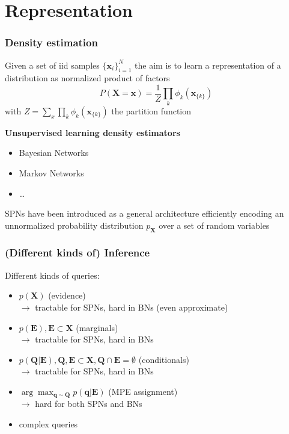 \documentclass[10pt, t, xcolor={usenames,dvipsnames,svgnames}, compress]{beamer}
\begin{document}
\section{Representation}
{
  \begin{frame}[c]
    \sectionpage
  \end{frame}
}

\begin{frame}
  \frametitle{Density estimation}

Given a set of iid samples $\{\mathbf x_i\}_{i=1}^N$ the aim is to learn a
representation of a distribution as normalized product of factors
$$P(\mathbf X = \mathbf x) = \frac{1}{Z}\prod_k \phi_k(\mathbf x_{\{k\}})$$
with $Z = \sum_x\prod_k \phi_k(\mathbf x_{\{k\}})$ the partition function

\vskip 0.5cm

{\color{violet} \textbf{Unsupervised learning density estimators}}
\begin{itemize}
  \item Bayesian Networks
  \item Markov Networks
  \item \ldots
\end{itemize}

SPNs have been introduced as a general architecture efficiently encoding an
unnormalized probability distribution $p_{\mathbf X}$ over a set of random 
variables


\end{frame}

\begin{frame}
  \frametitle{(Different kinds of) Inference}
  Different kinds of queries:
  \begin{itemize}
  \item $p(\mathbf{X})$ (evidence)\\
    \hfill {\color{violet} $\rightarrow$ tractable for SPNs, hard in BNs (even approximate)}
  \item $p(\mathbf{E}), \mathbf{E}\subset\mathbf{X}$ (marginals)\\
    \hfill {\color{violet} $\rightarrow$ tractable for SPNs, hard in BNs}
  \item $p(\mathbf{Q}|\mathbf{E}), \mathbf{Q},
    \mathbf{E}\subset\mathbf{X}, \mathbf{Q}\cap \mathbf{E}=\emptyset$
    (conditionals)\\
    \hfill \hfill {\color{violet} $\rightarrow$ tractable for SPNs, hard in BNs}
  \item
    $\arg\max_{\mathbf{q}\sim\mathbf{Q}}p(\mathbf{q}|\mathbf{E})$
    (MPE assignment)\\
    \hfill {\color{violet} $\rightarrow$ hard for both SPNs and BNs}
    \item complex queries
  \end{itemize}
\end{frame}
\end{document}
